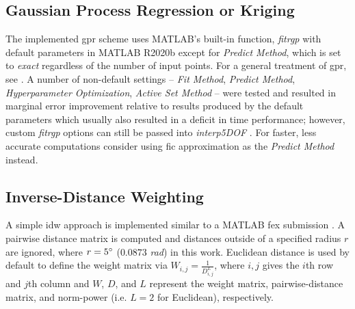 \documentclass[preprint,12pt]{elsarticle}
\begin{document}
\subsection{Gaussian Process Regression or Kriging} \label{sec:methods:gpr}

The implemented \gls{gpr} scheme uses MATLAB's built-in function, \textit{fitrgp} with default parameters in MATLAB R2020b except for \textit{Predict Method}, which is set to \textit{exact} regardless of the number of input points. For a general treatment of \gls{gpr}, see \cite{}. A number of non-default settings -- \textit{Fit Method}, \textit{Predict Method}, \textit{Hyperparameter Optimization}, \textit{Active Set Method} -- were tested and resulted in marginal error improvement relative to results produced by the default parameters which usually also resulted in a deficit in time performance; however, custom \textit{fitrgp} options can still be passed into \textit{interp5DOF} \cite{bairdFiveDegreeofFreedom5DOF2020}. For faster, less accurate computations consider using \gls{fic} approximation as the \textit{Predict Method} instead. %


\subsection{Inverse-Distance Weighting} \label{sec:methods:idw}

A simple \gls{idw} approach is implemented similar to a MATLAB \gls{fex} submission \cite{tovarInverseDistanceWeight2020}. A pairwise distance matrix is computed and distances outside of a specified radius $r$ are ignored, where $r = 5\degree$ ($0.0873$ \textit{rad}) in this work. Euclidean distance is used by default to define the weight matrix via $W_{i,j} = \frac{1}{D_{i,j}^L}$, where $i,j$ gives the $i$th row and $j$th column and $W$, $D$, and $L$ represent the weight matrix, pairwise-distance matrix, and norm-power (i.e. $L = 2$ for Euclidean), respectively.
\end{document}
